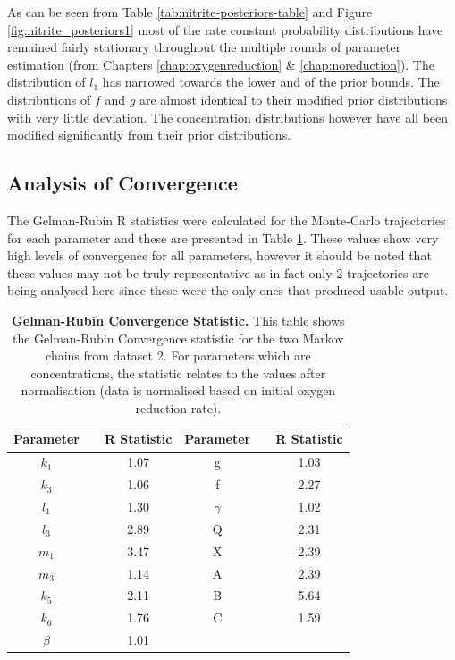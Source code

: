 As can be seen from Table \ref{tab:nitrite-posteriors-table} and Figure \ref{fig:nitrite_posteriors1} most of the rate constant probability distributions have remained fairly stationary throughout the multiple rounds of parameter estimation (from Chapters \ref{chap:oxygenreduction} \& \ref{chap:noreduction}). The distribution of $l_1$ has narrowed towards the lower and of the prior bounds. The distributions of $f$ and $g$ are almost identical to their modified prior distributions with very little deviation. The concentration distributions however have all been modified significantly from their prior distributions.

\subsection{Analysis of Convergence}
The Gelman-Rubin R statistics were calculated for the Monte-Carlo trajectories for each parameter and these are presented in Table \ref{tab:nitrite-r-stat}. These values show very high levels of convergence for all parameters, however it should be noted that these values may not be truly representative as in fact only 2 trajectories are being analysed here since these were the only ones that produced usable output.

\begin{table}[tbp]%
\renewcommand{\arraystretch}{1.5}
\begin{center}
\begin{tabular}{ccc|ccc}
\toprule
\textbf{Parameter} && \textbf{R Statistic} & \textbf{Parameter} && \textbf{R Statistic}\\
\midrule
$k_1$ && 1.07 & g && 1.03\\
$k_3$ && 1.06 & f && 2.27\\
$l_1$ && 1.30 & $\gamma$ && 1.02\\
$l_3$ && 2.89 & Q && 2.31\\
$m_1$ && 3.47 & X && 2.39\\
$m_3$ && 1.14 & A && 2.39\\
$k_5$ && 2.11 & B && 5.64\\
$k_6$ && 1.76 & C && 1.59\\
$\beta$ && 1.01\\
\bottomrule
\end{tabular}
\end{center}
\caption[Gelman-Rubin Convergence Statistic]{{\bf Gelman-Rubin Convergence Statistic.} This table shows the Gelman-Rubin Convergence statistic for the two Markov chains from dataset 2. For parameters which are concentrations, the statistic relates to the values after normalisation (data is normalised based on initial oxygen reduction rate).
\label{tab:nitrite-r-stat}}
\end{table}


